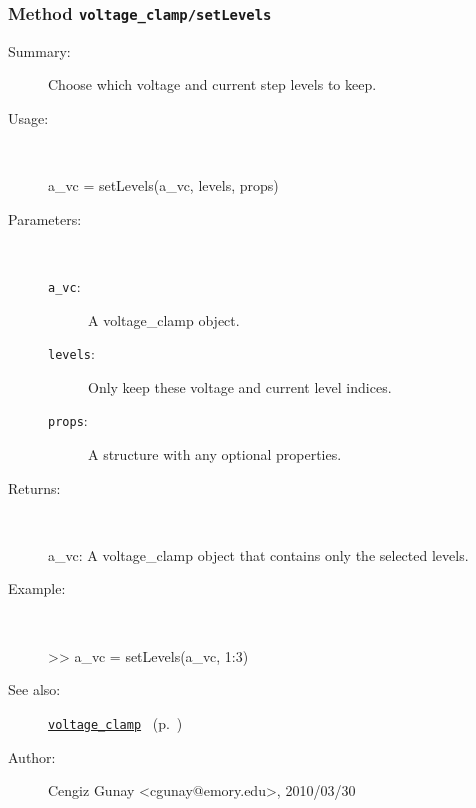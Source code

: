 \subsubsection[Method \texttt{setLevels}]{Method \texttt{voltage\_clamp/setLevels}}%
%
\label{ref_voltage_clamp__setLevels}%
\hypertarget{ref_voltage_clamp__setLevels}{}%
\begin{description}
\item[Summary:]Choose which voltage and current step levels to keep.
%
\item[Usage:]~%
\begin{lyxcode}%
a\_vc = setLevels(a\_vc, levels, props)
%
\end{lyxcode}%
%
%
\item[Parameters:]~
\begin{description}%
\item[\texttt{a\_vc}:]
 A voltage\_clamp object.
\item[\texttt{levels}:]
 Only keep these voltage and current level indices.
\item[\texttt{props}:]
 A structure with any optional properties.
\end{description}%
%
\item[Returns:
]~

   a\_vc: A voltage\_clamp object that contains only the selected levels.
%
\item[Example:]~
\begin{lyxcode} >> a\_vc = setLevels(a\_vc, 1:3) %
\\%
\end{lyxcode}
%
\item[See also:]%
\hyperlink{ref_voltage_clamp}{\texttt{voltage\_clamp}}%
\ (p.~\pageref{ref_voltage_clamp})%
%
%
\item[Author:]%
Cengiz Gunay <cgunay@emory.edu>, 2010/03/30
%
\end{description}
\methodline%
